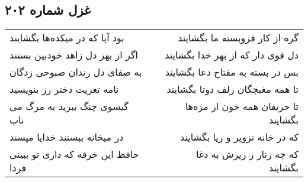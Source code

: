 \begin{center}
\section*{غزل شماره ۲۰۲}
\label{sec:sh202}
\begin{longtable}{l p{0.5cm} r}
بود آیا که در میکده‌ها بگشایند
&&
گره از کار فروبسته ما بگشایند
\\
اگر از بهر دل زاهد خودبین بستند
&&
دل قوی دار که از بهر خدا بگشایند
\\
به صفای دل رندان صبوحی زدگان
&&
بس در بسته به مفتاح دعا بگشایند
\\
نامه تعزیت دختر رز بنویسید
&&
تا همه مغبچگان زلف دوتا بگشایند
\\
گیسوی چنگ ببرید به مرگ می ناب
&&
تا حریفان همه خون از مژه‌ها بگشایند
\\
در میخانه ببستند خدایا مپسند
&&
که در خانه تزویر و ریا بگشایند
\\
حافظ این خرقه که داری تو ببینی فردا
&&
که چه زنار ز زیرش به دغا بگشایند
\\
\end{longtable}
\end{center}
